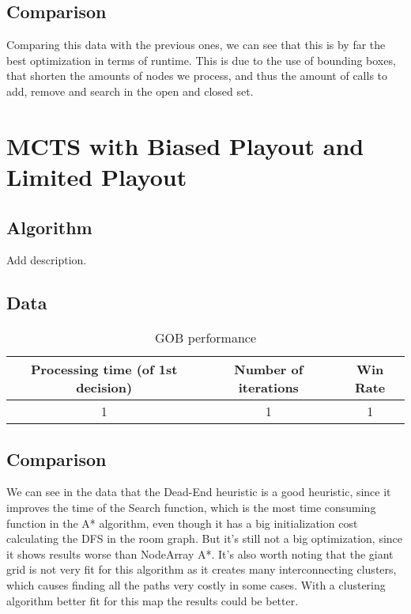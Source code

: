 \documentclass{article}
\begin{document}
  \subsection{Comparison}
  Comparing this data with the previous ones, we can see that this is by far the best optimization in terms of runtime. This is due to the use of bounding boxes,
  that shorten the amounts of nodes we process, and thus the amount of calls to add, remove and search in the open and closed set.\\

  \section{MCTS with Biased Playout and Limited Playout}

  \subsection{Algorithm}
  Add description.\\
  
  \subsection{Data}
  \begin{table}[h!]
    \centering
    \caption{GOB performance}
    \label{tab:tableGOB1}
    \begin{tabular}{c|c|c}
      \textbf{Processing time (of 1st decision)} & \textbf{Number of iterations} & \textbf{Win Rate}\\
      \hline
      1 & 1 & 1
    \end{tabular}
  \end{table}

  \subsection{Comparison}
  We can see in the data that the Dead-End heuristic is a good heuristic, since it improves the time of the Search function, which is the most time consuming function 
  in the A* algorithm, even though it has a big initialization cost calculating the DFS in the room graph. But it's still not a big optimization, since it shows 
  results worse than NodeArray A*. It's also worth noting that the giant grid is not very fit for this algorithm as it creates many interconnecting clusters, which
  causes finding all the paths very costly in some cases. With a clustering algorithm better fit for this map the results could be better.\\
\end{document}
